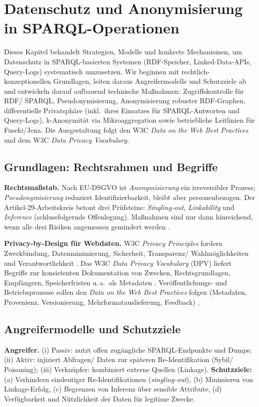 \section{Datenschutz und Anonymisierung in SPARQL-Operationen}
\label{sec:Datenschutz und Anonymisierung in SPARQL-Operationen}

Dieses Kapitel behandelt Strategien, Modelle und konkrete Mechanismen, um Datenschutz in SPARQL-basierten Systemen (RDF-Speicher, Linked-Data-APIs, Query-Logs) systematisch umzusetzen. Wir beginnen mit rechtlich-konzeptionellen Grundlagen, leiten daraus Angreifermodelle und Schutzziele ab und entwickeln darauf aufbauend technische Maßnahmen: Zugriffskontrolle für RDF/ SPARQL, Pseudonymisierung, Anonymisierung robuster RDF-Graphen, differentielle Privatsphäre (inkl.\ ihres Einsatzes für SPARQL-Antworten und Query-Logs), k-Anonymität via Mikroaggregation sowie betriebliche Leitlinien für Fuseki/Jena. Die Ausgestaltung folgt den W3C \emph{Data on the Web Best Practices} und dem W3C \emph{Data Privacy Vocabulary}.

\subsection{Grundlagen: Rechtsrahmen und Begriffe}
\textbf{Rechtsmaßstab.} Nach EU-DSGVO ist \emph{Anonymisierung} ein irreversibler Prozess; \emph{Pseudonymisierung} reduziert Identifizierbarkeit, bleibt aber personenbezogen. Der Artikel-29-Arbeitskreis betont drei Prüfsteine: \emph{Singling-out}, \emph{Linkability} und \emph{Inference} (schlussfolgernde Offenlegung). Maßnahmen sind nur dann hinreichend, wenn alle drei Risiken angemessen gemindert werden \cite{Art29WPAnonymisation, MisunderstandingsAnon, PseudonymisationBest}.

\textbf{Privacy-by-Design für Webdaten.} W3C \emph{Privacy Principles} fordern Zweckbindung, Datenminimierung, Sicherheit, Transparenz/ Wahlmöglichkeiten und Verantwortlichkeit \cite{W3CPrivacyPrinciples}. Das W3C \emph{Data Privacy Vocabulary} (DPV) liefert Begriffe zur konsistenten Dokumentation von Zwecken, Rechtsgrundlagen, Empfängern, Speicherfristen u.\,a.\ als Metadaten \cite{W3CDPV}. Veröffentlichungs- und Betriebsprozesse sollen den \emph{Data on the Web Best Practices} folgen (Metadaten, Provenienz, Versionierung, Mehrformatauslieferung, Feedback) \cite{W3CDWBP}.

\subsection{Angreifermodelle und Schutzziele}
\textbf{Angreifer.} (i) Passiv: nutzt offen zugängliche SPARQL-Endpunkte und Dumps; (ii) Aktiv: injiziert Abfragen/ Daten zur späteren Re-Identifikation (Sybil/ Poisoning); (iii) Verknüpfer: kombiniert externe Quellen (Linkage). \textbf{Schutzziele:} (a) Verhindern eindeutiger Re-Identifikationen (\emph{singling-out}), (b) Minimieren von Linkage-Erfolg, (c) Begrenzen von Inferenz über sensible Attribute, (d) Verfügbarkeit und Nützlichkeit der Daten für legitime Zwecke.

